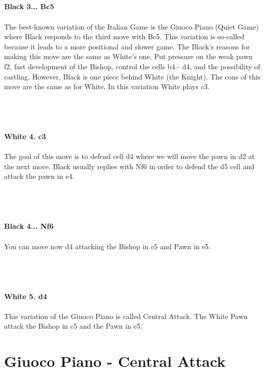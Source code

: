 \documentclass{article}
\begin{document}

\\
\\

\\
\\
\textbf{Black 3... Bc5}\\
\\
The best-known variation of the Italian Game is the Giuoco Piano (Quiet Game) where Black responds to the third move with Bc5. This variation is so-called because it leads to a more positional and slower game. The Black's reasons for making this move are the same as White's one. Put pressure on the weak pawn f2, fast development of the Bishop, control the cells b4 - d4, and the possibility of castling. However, Black is one piece behind White (the Knight). The cons of this move are the same as for White. In this variation White plays c3.\\\\
\\

\\
\\
\textbf{White 4. c3}\\
\\
The goal of this move is to defend cell d4 where we will move the pawn in d2 at the next move. Black usually replies with Nf6 in order to defend the d5 cell and attack the pawn in e4.\\\\
\\

\\
\\
\textbf{Black 4... Nf6}\\
\\
You can move now d4 attacking the Bishop in c5 and Pawn in e5.\\\\
\\

\\
\\
\textbf{White 5. d4}\\
\\
This variation of the Giuoco Piano is called Central Attack. The White Pawn attack the Bishop in c5 and the Pawn in e5.\\\section{ Giuoco Piano - Central Attack}
\end{document}
